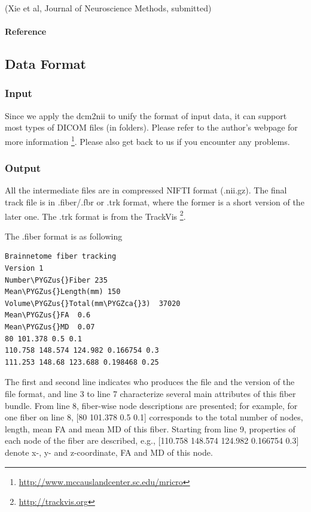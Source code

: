 \documentclass[letterpaper,10pt,english]{sphinxmanual}
\def\PYGZus{\char`\_}
\def\PYGZca{\char`\^}
\begin{document}
(Xie et al, Journal of Neuroscience Methods, submitted)


\paragraph{Reference}
\label{exampledata:reference}

\subsection{Data Format}
\label{fileformat:data-format}\label{fileformat::doc}\label{fileformat:id1}

\subsubsection{Input}
\label{fileformat:input}
Since we apply the dcm2nii to unify the format of input data,
it can support most types of DICOM files (in folders).
Please refer to the author’s webpage for more information \footnote{
\href{http://www.mccauslandcenter.sc.edu/mricro}{http://www.mccauslandcenter.sc.edu/mricro}
}.
Please also get back to us if you encounter any problems.


\subsubsection{Output}
\label{fileformat:output}
All the intermediate files are in compressed NIFTI format (.nii.gz). The final track file is in .fiber/.fbr or .trk format, where the former is a short version of the later one. The .trk format is from the TrackVis \footnote{
\href{http://trackvis.org}{http://trackvis.org}
}.

The .fiber format is as following

\begin{Verbatim}[commandchars=\\\{\}]
Brainnetome fiber tracking
Version 1
Number\PYGZus{}Fiber 235
Mean\PYGZus{}Length(mm) 150
Volume\PYGZus{}Total(mm\PYGZca{}3)  37020
Mean\PYGZus{}FA  0.6
Mean\PYGZus{}MD  0.07
80 101.378 0.5 0.1
110.758 148.574 124.982 0.166754 0.3
111.253 148.68 123.688 0.198468 0.25
\end{Verbatim}

The first and second line indicates who produces the file and the version of the file format, and line 3 to line 7 characterize several main attributes of this fiber bundle. From line 8, fiber-wise node descriptions are presented; for example, for one fiber on line 8, {[}80 101.378 0.5 0.1{]} corresponds to the total number of nodes, length, mean FA and mean MD of this fiber. Starting from line 9, properties of each node of the fiber are described, e.g., {[}110.758 148.574 124.982 0.166754 0.3{]} denote x-, y- and z-coordinate, FA and MD of this node.
\end{document}
